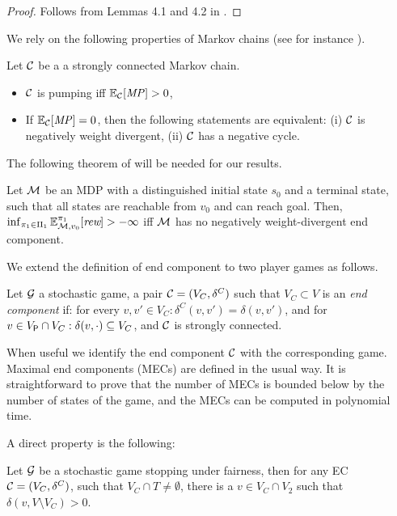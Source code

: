 \begin{proof} Follows from Lemmas 4.1 and 4.2 in \cite{DBLP:conf/lics/Baier0DGS18}.
\end{proof}
	We rely on the following properties of Markov chains (see for instance \cite{DBLP:conf/lics/Baier0DGS18}).
\begin{property} Let $\mathcal{C}$ be a a strongly connected Markov chain. 
\begin{itemize}
	\item $\mathcal{C}$ is pumping iff $\mathbb{E}_{\mathcal{C}}[\mathit{MP}] > 0$,
	\item If $\mathbb{E}_{\mathcal{C}}[\mathit{MP}] = 0$, then the following statements are equivalent: (i) $\mathcal{C}$ is negatively weight divergent, (ii) $\mathcal{C}$ has a negative cycle.
\end{itemize}
\end{property}	
	The following theorem of \cite{DBLP:conf/lics/Baier0DGS18} will be needed for our results.
\begin{theorem} Let $\mathcal{M}$ be an MDP with a distinguished initial state $s_0$ and a terminal state,   such that all states are reachable
from $v_0$ and can reach goal. Then,  $\inf_{\pi_{1} \in \Pi_{1}} \mathbb{E}^{\pi_{1}}_{\mathcal{M},v_0}[\textit{rew}] > - \infty$ iff
$\mathcal{M}$ has no negatively weight-divergent end component.
\end{theorem}
	 We extend the definition of end component to two player games as follows.
\begin{definition} Let $\mathcal{G}$ a stochastic game,  a pair $\mathcal{C} = (V_C,\delta^C)$ such that  $V_C \subset V$ is an \emph{end component} if: 
for every $v,v' \in V_C: \delta^C(v,v') = \delta(v,v')$, and for $v \in V_{\mathsf{P}} \cap V_C : \delta(v,\cdot) \subseteq V_C$, and $\mathcal{C}$ is strongly connected.
\end{definition}
	When useful we identify the end component $\mathcal{C}$ with the corresponding game.
	Maximal end components (MECs) are defined in the usual way. It is straightforward to prove that the number of MECs is bounded below by the number of states of the game, and the 
MECs can be computed in polynomial time.
		
	A direct property is the following:
\begin{lemma}\label{lemma:end-components-player2} Let $\mathcal{G}$ be a stochastic game stopping under fairness, then for any EC $\mathcal{C} = (V_C,\delta^C)$, such that $V_C \cap T \neq \emptyset$,  there is a  $v \in V_C \cap V_2$ such that  $\delta(v, V \setminus V_C) > 0$.
\end{lemma}	
	
